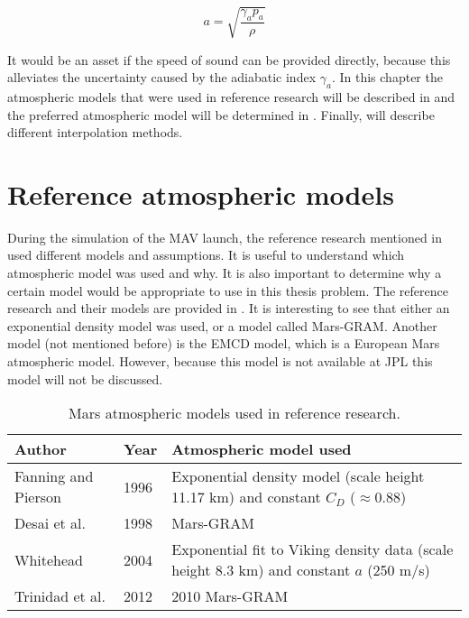 \begin{equation} \label{eq:speedofsoundpressure}
a=\sqrt{\dfrac{\gamma_{a}p_{a}}{\rho}}
\end{equation}


It would be an asset if the speed of sound can be provided directly, because this alleviates the uncertainty caused by the adiabatic index $\gamma_{a}$. In this chapter the atmospheric models that were used in reference research will be described in  and the preferred atmospheric model will be determined in . Finally,  will describe different interpolation methods.



\section{Reference atmospheric models}
\label{sec:difatmod}
During the simulation of the \ac{MAV} launch, the reference research mentioned in  used different models and assumptions. It is useful to understand which atmospheric model was used and why. It is also important to determine why a certain model would be appropriate to use in this thesis problem. The reference research and their models are provided in . It is interesting to see that either an exponential density model was used, or a model called Mars-\ac{GRAM}. Another model (not mentioned before) is the EMCD model, which is a European Mars atmospheric model. However, because this model is not available at \ac{JPL} this model will not be discussed.


\begin{table}[!ht]
\begin{center}
\caption{Mars atmospheric models used in reference research.}
\label{tab:marsascent_refres_atm}
\begin{tabular}{|p{3cm}|l|p{7cm}|}
\hline 
\textbf{Author} &	\textbf{Year} & \textbf{Atmospheric model used} \\ \hline \hline
Fanning and Pierson \cite{fanning1996model} & 1996 & Exponential density model (scale height 11.17 km) and constant $C_{D}$ ($\approx$0.88)\\ \hline
Desai et al. \cite{desai1998} & 1998 & Mars-\ac{GRAM} \\ \hline
Whitehead \cite{whitehead2004mars,whitehead2005} & 2004 & Exponential fit to Viking density data (scale height 8.3  km) and constant $a$ (250 m/s) \\ \hline
Trinidad et al. \cite{trinidad2012} & 2012 & 2010 Mars-\ac{GRAM} \\ \hline

\end{tabular}
\end{center}
\end{table}

